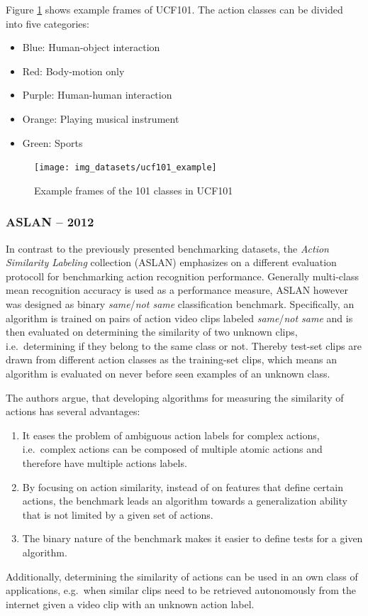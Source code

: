 Figure \ref{fig:ucf101_example} shows example frames of UCF101.
The action classes can be divided into five categories: \cite{soomro_ucf101:_2012}
\begin{itemize}
    \item Blue: Human-object interaction
    \item Red: Body-motion only
    \item Purple: Human-human interaction
    \item Orange: Playing musical instrument
    \item Green: Sports
\end{itemize}

\begin{figure}
    \centering
    \texttt{[image: img\_datasets/ucf101\_example]}
    \caption{Example frames of the 101 classes in UCF101 \cite{soomro_ucf101:_2012}}
    \label{fig:ucf101_example}
\end{figure}


\subsubsection{ASLAN -- 2012}
In contrast to the previously presented benchmarking datasets, the \textit{Action Similarity Labeling} collection (ASLAN) \cite{kliper-gross_action_2012} emphasizes on a different evaluation protocoll for benchmarking action recognition performance.
Generally multi-class mean recognition accuracy is used as a performance measure, ASLAN however was designed as binary \textit{same}/\textit{not same} classification benchmark.
Specifically, an algorithm is trained on pairs of action video clips labeled \textit{same}/\textit{not same} and is then evaluated on determining the similarity of two unknown clips, i.e.\ determining if they belong to the same class or not.
Thereby test-set clips are drawn from different action classes as the training-set clips, which means an algorithm is evaluated on never before seen examples of an unknown class.

The authors \textcite{kliper-gross_action_2012} argue, that developing algorithms for measuring the similarity of actions has several advantages:
\begin{enumerate}
    \item It eases the problem of ambiguous action labels for complex actions, i.e.\ complex actions can be composed of multiple atomic actions and therefore have multiple actions labels.
    \item By focusing on action similarity, instead of on features that define certain actions, the benchmark leads an algorithm towards a generalization ability that is not limited by a given set of actions.
    \item The binary nature of the benchmark makes it easier to define tests for a given algorithm.
\end{enumerate}
Additionally, determining the similarity of actions can be used in an own class of applications, e.g.\ when similar clips need to be retrieved autonomously from the internet given a video clip with an unknown action label.

